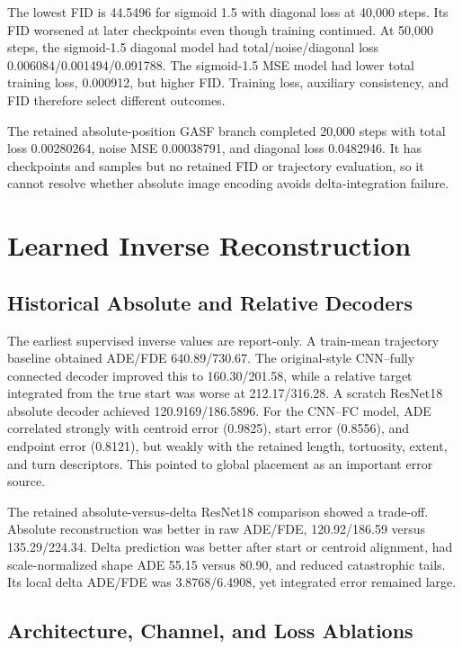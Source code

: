 \documentclass[12pt,a4paper,oneside]{report}
\begin{document}
The lowest FID is 44.5496 for sigmoid 1.5 with diagonal loss at 40,000 steps. Its FID worsened at later checkpoints even though training continued. At 50,000 steps, the sigmoid-1.5 diagonal model had total/noise/diagonal loss 0.006084/0.001494/0.091788. The sigmoid-1.5 MSE model had lower total training loss, 0.000912, but higher FID. Training loss, auxiliary consistency, and FID therefore select different outcomes.

The retained absolute-position GASF branch completed 20,000 steps with total loss 0.00280264, noise MSE 0.00038791, and diagonal loss 0.0482946. It has checkpoints and samples but no retained FID or trajectory evaluation, so it cannot resolve whether absolute image encoding avoids delta-integration failure.

\section{Learned Inverse Reconstruction}

\subsection{Historical Absolute and Relative Decoders}

The earliest supervised inverse values are report-only. A train-mean trajectory baseline obtained ADE/FDE 640.89/730.67. The original-style CNN--fully connected decoder improved this to 160.30/201.58, while a relative target integrated from the true start was worse at 212.17/316.28. A scratch ResNet18 absolute decoder achieved 120.9169/186.5896. For the CNN--FC model, ADE correlated strongly with centroid error (0.9825), start error (0.8556), and endpoint error (0.8121), but weakly with the retained length, tortuosity, extent, and turn descriptors. This pointed to global placement as an important error source.

The retained absolute-versus-delta ResNet18 comparison showed a trade-off. Absolute reconstruction was better in raw ADE/FDE, 120.92/186.59 versus 135.29/224.34. Delta prediction was better after start or centroid alignment, had scale-normalized shape ADE 55.15 versus 80.90, and reduced catastrophic tails. Its local delta ADE/FDE was 3.8768/6.4908, yet integrated error remained large.

\subsection{Architecture, Channel, and Loss Ablations}
\end{document}
